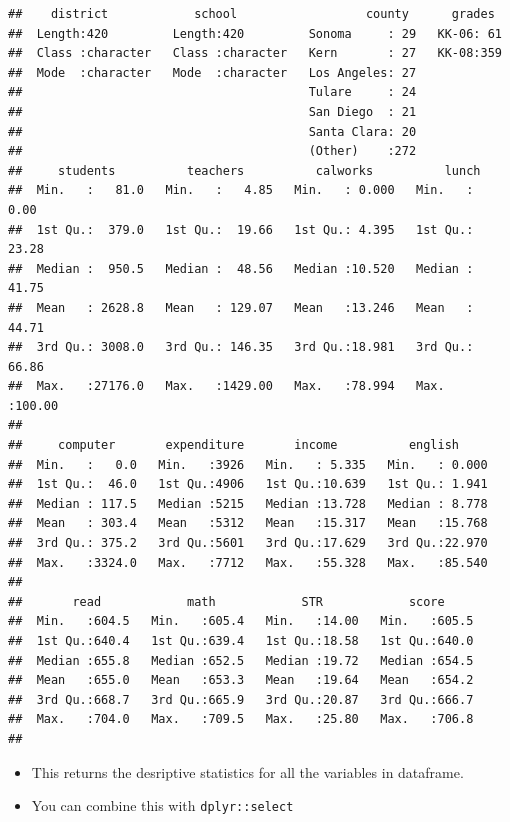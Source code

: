 \documentclass[]{book}
\providecommand{\tightlist}{%
  \setlength{\itemsep}{0pt}\setlength{\parskip}{0pt}}
\begin{document}
\begin{verbatim}
##    district            school                  county      grades   
##  Length:420         Length:420         Sonoma     : 29   KK-06: 61  
##  Class :character   Class :character   Kern       : 27   KK-08:359  
##  Mode  :character   Mode  :character   Los Angeles: 27              
##                                        Tulare     : 24              
##                                        San Diego  : 21              
##                                        Santa Clara: 20              
##                                        (Other)    :272              
##     students          teachers          calworks          lunch       
##  Min.   :   81.0   Min.   :   4.85   Min.   : 0.000   Min.   :  0.00  
##  1st Qu.:  379.0   1st Qu.:  19.66   1st Qu.: 4.395   1st Qu.: 23.28  
##  Median :  950.5   Median :  48.56   Median :10.520   Median : 41.75  
##  Mean   : 2628.8   Mean   : 129.07   Mean   :13.246   Mean   : 44.71  
##  3rd Qu.: 3008.0   3rd Qu.: 146.35   3rd Qu.:18.981   3rd Qu.: 66.86  
##  Max.   :27176.0   Max.   :1429.00   Max.   :78.994   Max.   :100.00  
##                                                                       
##     computer       expenditure       income          english      
##  Min.   :   0.0   Min.   :3926   Min.   : 5.335   Min.   : 0.000  
##  1st Qu.:  46.0   1st Qu.:4906   1st Qu.:10.639   1st Qu.: 1.941  
##  Median : 117.5   Median :5215   Median :13.728   Median : 8.778  
##  Mean   : 303.4   Mean   :5312   Mean   :15.317   Mean   :15.768  
##  3rd Qu.: 375.2   3rd Qu.:5601   3rd Qu.:17.629   3rd Qu.:22.970  
##  Max.   :3324.0   Max.   :7712   Max.   :55.328   Max.   :85.540  
##                                                                   
##       read            math            STR            score      
##  Min.   :604.5   Min.   :605.4   Min.   :14.00   Min.   :605.5  
##  1st Qu.:640.4   1st Qu.:639.4   1st Qu.:18.58   1st Qu.:640.0  
##  Median :655.8   Median :652.5   Median :19.72   Median :654.5  
##  Mean   :655.0   Mean   :653.3   Mean   :19.64   Mean   :654.2  
##  3rd Qu.:668.7   3rd Qu.:665.9   3rd Qu.:20.87   3rd Qu.:666.7  
##  Max.   :704.0   Max.   :709.5   Max.   :25.80   Max.   :706.8  
## 
\end{verbatim}

\begin{itemize}
\tightlist
\item
  This returns the desriptive statistics for all the variables in
  dataframe.
\item
  You can combine this with \texttt{dplyr::select}
\end{itemize}
\end{document}

